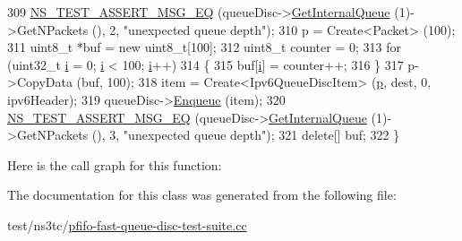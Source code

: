 \begin{DoxyCode}
309   \hyperlink{group__testing_ga2a9d78cffb3db8e867c35fff0b698cf5}{NS\_TEST\_ASSERT\_MSG\_EQ} (queueDisc->\hyperlink{classns3_1_1QueueDisc_adf09b498c07c5677c26ea4b8309def74}{GetInternalQueue} (1)->GetNPackets 
      (), 2, \textcolor{stringliteral}{"unexpected queue depth"});
310   p = Create<Packet> (100);
311   uint8\_t *buf = \textcolor{keyword}{new} uint8\_t[100];
312   uint8\_t counter = 0;
313   \textcolor{keywordflow}{for} (uint32\_t \hyperlink{bernuolliDistribution_8m_a6f6ccfcf58b31cb6412107d9d5281426}{i} = 0; \hyperlink{bernuolliDistribution_8m_a6f6ccfcf58b31cb6412107d9d5281426}{i} < 100; \hyperlink{bernuolliDistribution_8m_a6f6ccfcf58b31cb6412107d9d5281426}{i}++)
314     \{
315       buf[\hyperlink{bernuolliDistribution_8m_a6f6ccfcf58b31cb6412107d9d5281426}{i}] = counter++;
316     \}
317   p->CopyData (buf, 100);
318   item = Create<Ipv6QueueDiscItem> (\hyperlink{lte__link__budget_8m_ac9de518908a968428863f829398a4e62}{p}, dest, 0, ipv6Header);
319   queueDisc->\hyperlink{classns3_1_1QueueDisc_af452fb01b98fed312125163f1fe85431}{Enqueue} (item);
320   \hyperlink{group__testing_ga2a9d78cffb3db8e867c35fff0b698cf5}{NS\_TEST\_ASSERT\_MSG\_EQ} (queueDisc->\hyperlink{classns3_1_1QueueDisc_adf09b498c07c5677c26ea4b8309def74}{GetInternalQueue} (1)->GetNPackets 
      (), 3, \textcolor{stringliteral}{"unexpected queue depth"});
321   \textcolor{keyword}{delete}[] buf;
322 \}
\end{DoxyCode}


Here is the call graph for this function\+:




The documentation for this class was generated from the following file\+:\begin{DoxyCompactItemize}
\item 
test/ns3tc/\hyperlink{pfifo-fast-queue-disc-test-suite_8cc}{pfifo-\/fast-\/queue-\/disc-\/test-\/suite.\+cc}\end{DoxyCompactItemize}

